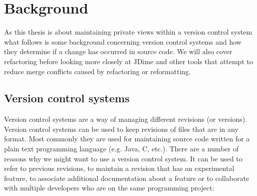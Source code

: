 \chapter{Background}

As this thesis is about maintaining private views within a version control system what follows is some background concerning version control systems and how they determine if a change has occurred in source code.  
We will also cover refactoring before looking more closely at JDime and other tools that attempt to reduce merge conflicts caused by refactoring or reformatting.  

\section{Version control systems}
Version control systems are a way of managing different revisions (or versions). 
Version control systems can be used to keep revisions of files that are in any format. 
Most commonly they are used for maintaining source code written for a plain text programming language (e.g. Java, C, etc.). 
There are a number of reasons why we might want to use a version control system. It can be used to refer to previous revisions, to maintain a revision that has an experimental feature, to associate additional documentation about a feature or to collaborate with multiple developers who are on the same programming project:

